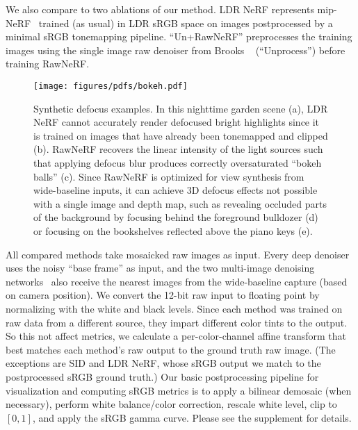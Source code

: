 We also compare to two ablations of our method. LDR NeRF represents mip-NeRF~\cite{barron2021} trained (as usual) in LDR sRGB space on images postprocessed by a minimal sRGB tonemapping pipeline. ``Un+RawNeRF'' preprocesses the training images using the single image raw denoiser from Brooks \etal~\cite{brooks2019cvpr} (``Unprocess'') before training RawNeRF.








\begin{figure*}
    \centering
    \texttt{[image: figures/pdfs/bokeh.pdf]}
    \caption{Synthetic defocus examples. In this nighttime garden scene (a), LDR NeRF cannot accurately render defocused bright highlights since it is trained on images that have already been tonemapped and clipped (b). RawNeRF recovers the linear intensity of the light sources such that applying defocus blur produces correctly oversaturated ``bokeh balls'' (c). 
    Since RawNeRF is optimized for view synthesis from wide-baseline inputs, it can achieve 3D defocus effects not possible with a single image and depth map, such as revealing occluded parts of the background by focusing behind the foreground bulldozer (d) or focusing on the bookshelves reflected above the piano keys (e).
    }
    \label{fig:bokeh_banner}
\end{figure*}


All compared methods take mosaicked raw images as input. 
Every deep denoiser~\cite{chen2018cvpr,brooks2019cvpr,rvidenet,udvd} uses the noisy ``base frame'' as input, and the two multi-image denoising networks~\cite{rvidenet,udvd} also receive the nearest images from the wide-baseline capture (based on camera position).
We convert the 12-bit raw input to floating point by normalizing with the white and black levels. 
Since each method was trained on raw data from a different source, they impart different color tints to the output. So this not affect metrics, we calculate a per-color-channel affine transform that best matches each method's raw output to the ground truth raw image. (The exceptions are SID and LDR NeRF, whose sRGB output we match to the postprocessed sRGB ground truth.) Our basic postprocessing pipeline for visualization and computing sRGB metrics is to apply a bilinear demosaic (when necessary), perform white balance/color correction, rescale white level, clip to $[0, 1]$, and apply the sRGB gamma curve. Please see the supplement for details.





